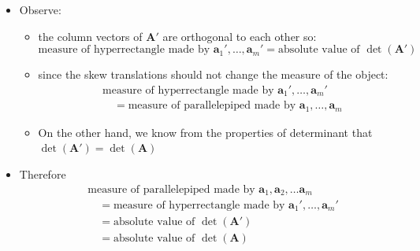 \documentclass[12pt,a4paper]{article}
\begin{document}
\begin{itemize}
\begin{itemize}
\begin{figure}[t]
        {figures/fig_integration_2.png}
        \caption{%
          Skew translation and determinant
        } 
        \label{fig:integration_2}
      \end{figure} 
  \item Observe:
    \begin{itemize}
    \item the column vectors of $\bm{A}'$ are orthogonal to each other so:
      \begin{equation}\nonumber%
        \text{measure of hyperrectangle made by $\bm{a}_{1}',\ldots,\bm{a}_{m}'$}
        = \text{absolute value of $\det(\bm{A}')$}
      \end{equation}
    \item since the skew translations should not change the measure of the object:
      \begin{align}
        & \text{measure of hyperrectangle made by $\bm{a}_{1}',\ldots,\bm{a}_{m}'$} \nonumber \\
        & \quad = \text{measure of parallelepiped made by $\bm{a}_{1},\ldots,\bm{a}_{m}$}
          \nonumber%
      \end{align}
    \item On the other hand, we know from the properties of determinant that $\det(\bm{A}') = \det(\bm{A})$
    \end{itemize}
    \clearpage
  \item Therefore
    \begin{align}
      & \text{measure of parallelepiped made by $\bm{a}_{1}, \bm{a}_{2},\ldots \bm{a}_{m}$} \nonumber \\
      & \quad = \text{measure of hyperrectangle made by $\bm{a}_{1}',\ldots,\bm{a}_{m}'$} \nonumber \\
      & \quad = \text{absolute value of $\det(\bm{A}')$} \nonumber \\
      & \quad = \text{absolute value of $\det(\bm{A})$}
    \nonumber%
    \end{align}
    \end{itemize}


\end{itemize}
\end{document}
